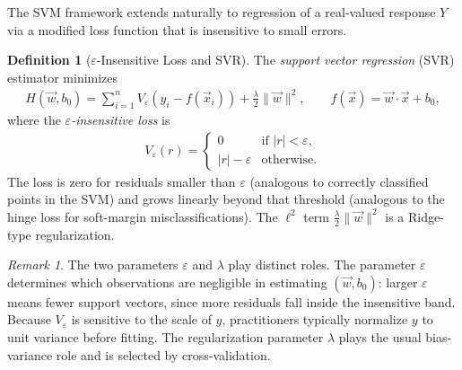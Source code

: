 \documentclass[11pt]{article}
\theoremstyle{definition}
\newtheorem{definition}{Definition}[section]
\theoremstyle{plain}
\theoremstyle{remark}
\newtheorem{remark}{Remark}[section]
\begin{document}
The SVM framework extends naturally to regression of a real-valued response $Y$ via a modified loss function that is insensitive to small errors.

\begin{definition}[$\varepsilon$-Insensitive Loss and SVR]
    The \emph{support vector regression} (SVR) estimator minimizes
    \begin{align}
        H(\vec{w}, b_0) = \sum_{i=1}^n V_\varepsilon(y_i - f(\vec{x}_i)) + \frac{\lambda}{2}\|\vec{w}\|^2, \qquad f(\vec{x}) = \vec{w}\cdot\vec{x} + b_0,
    \end{align}
    where the \emph{$\varepsilon$-insensitive loss} is
    \begin{align}
        V_\varepsilon(r) = \begin{cases} 0 & \text{if } |r| < \varepsilon, \\ |r| - \varepsilon & \text{otherwise.} \end{cases}
    \end{align}
    The loss is zero for residuals smaller than $\varepsilon$ (analogous to correctly classified points in the SVM) and grows linearly beyond that threshold (analogous to the hinge loss for soft-margin misclassifications). The $\ell^2$ term $\frac{\lambda}{2}\|\vec{w}\|^2$ is a Ridge-type regularization.
\end{definition}

\begin{remark}
    The two parameters $\varepsilon$ and $\lambda$ play distinct roles. The parameter $\varepsilon$ determines which observations are negligible in estimating $(\vec{w},b_0)$: larger $\varepsilon$ means fewer support vectors, since more residuals fall inside the insensitive band. Because $V_\varepsilon$ is sensitive to the scale of $y$, practitioners typically normalize $y$ to unit variance before fitting. The regularization parameter $\lambda$ plays the usual bias-variance role and is selected by cross-validation.
\end{remark}
\end{document}
